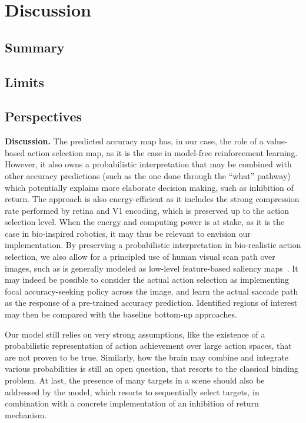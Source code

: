 \CNS
\section{Discussion}
\label{sec:discussion}

\subsection{Summary}

\subsection{Limits}

\subsection{Perspectives}
\else
\textbf{Discussion. }
The predicted accuracy map has, in our case, the role of a value-based action selection map, as it is the case in model-free reinforcement learning. However, it also owns a probabilistic interpretation that may be combined with other accuracy predictions (such as the one done through the ``what'' pathway) which potentially explains more elaborate decision making, such as inhibition of return. The approach is also energy-efficient as it includes the strong compression rate performed by retina and V1 encoding, which is preserved up to the action selection level. When the energy and computing power is at stake, as it is the case in bio-inspired robotics, it may thus be relevant to envision our implementation. By preserving a probabilistic interpretation in bio-realistic action selection, we also allow for a principled use of human visual scan path over images, such as is generally modeled as low-level feature-based saliency maps~\citep{Itti01}. It may indeed be possible to consider the actual action selection as implementing focal accuracy-seeking policy across the image, and learn the actual saccade path as the response of a pre-trained accuracy prediction. Identified regions of interest may then be compared with the baseline bottom-up approaches.

Our model still relies on very strong assumptions, like the existence of a probabilistic representation of action achievement over large action spaces, that are not proven to be true. Similarly, how the brain may combine and integrate various probabilities is still an open question, that resorts to the classical binding problem. %
At last, the presence of many targets in a scene should also be addressed by the model, which resorts to sequentially select targets, in combination with a concrete implementation of an inhibition of return mechanism.   

\fi
